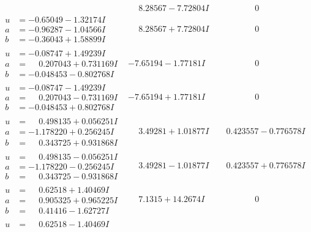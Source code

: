 \documentclass[1p]{elsarticle_modified}
\theoremstyle{definition}
\begin{document}
$$\begin{array}{c|c|c}
 & \phantom{-}8.28567 - 7.72804 I & \phantom{-0.000000 } 0 \\ \hline\begin{aligned}
u &= -0.65049 - 1.32174 I \\
a &= -0.96287 - 1.04566 I \\
b &= -0.36043 + 1.58899 I\end{aligned}
 & \phantom{-}8.28567 + 7.72804 I & \phantom{-0.000000 } 0 \\ \hline\begin{aligned}
u &= -0.08747 + 1.49239 I \\
a &= \phantom{-}0.207043 + 0.731169 I \\
b &= -0.048453 - 0.802768 I\end{aligned}
 & -7.65194 - 1.77181 I & \phantom{-0.000000 } 0 \\ \hline\begin{aligned}
u &= -0.08747 - 1.49239 I \\
a &= \phantom{-}0.207043 - 0.731169 I \\
b &= -0.048453 + 0.802768 I\end{aligned}
 & -7.65194 + 1.77181 I & \phantom{-0.000000 } 0 \\ \hline\begin{aligned}
u &= \phantom{-}0.498135 + 0.056251 I \\
a &= -1.178220 + 0.256245 I \\
b &= \phantom{-}0.343725 + 0.931868 I\end{aligned}
 & \phantom{-}3.49281 + 1.01877 I & \phantom{-}0.423557 - 0.776578 I \\ \hline\begin{aligned}
u &= \phantom{-}0.498135 - 0.056251 I \\
a &= -1.178220 - 0.256245 I \\
b &= \phantom{-}0.343725 - 0.931868 I\end{aligned}
 & \phantom{-}3.49281 - 1.01877 I & \phantom{-}0.423557 + 0.776578 I \\ \hline\begin{aligned}
u &= \phantom{-}0.62518 + 1.40469 I \\
a &= \phantom{-}0.905325 + 0.965225 I \\
b &= \phantom{-}0.41416 - 1.62727 I\end{aligned}
 & \phantom{-}7.1315 + 14.2674 I & \phantom{-0.000000 } 0 \\ \hline\begin{aligned}
u &= \phantom{-}0.62518 - 1.40469 I \\

\end{aligned}
\end{array}$$
\end{document}
